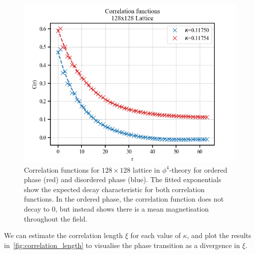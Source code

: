 \documentclass[11pt]{article}
\begin{document}
    \begin{figure}[h!]
        \center
        \includegraphics[width=\linewidth]{../figures/CorrelationFunction128}
        \caption{
            Correlation functions for $128 \times 128$ lattice in $\phi^4$-theory for ordered phase (red) and disordered
            phase (blue).
            The fitted exponentials show the expected decay characteristic for both correlation functions.
            In the ordered phase, the correlation function does not decay to 0, but instead shows there is a mean
            magnetisation throughout the field.
        }\label{fig:correlation_functions_128}
    \end{figure}

    We can estimate the correlation length $\xi$ for each value of $\kappa$, and plot the results
    in~\cref{fig:correlation_length} to visualise the phase transition as a divergence in $\xi$.
\end{document}
